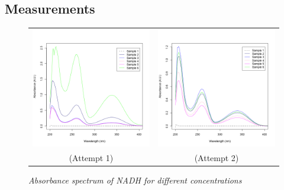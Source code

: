\documentclass[a4paper,10pt]{article}
\begin{document}
        \subsection*{Measurements}
            \begin{figure}[H]
                \centering
                \begin{tabular}{c c}
                    \includegraphics[width=215px]{../resources/absorption_r1_spectrum.png} &
                    \includegraphics[width=215px]{../resources/absorption_r2_spectrum.png} \\
                    (Attempt 1) & (Attempt 2)\\
                \end{tabular}
                \caption{\it Absorbance spectrum of NADH for different concentrations}\label{fig:abs_spectrum}
            \end{figure}
\end{document}
